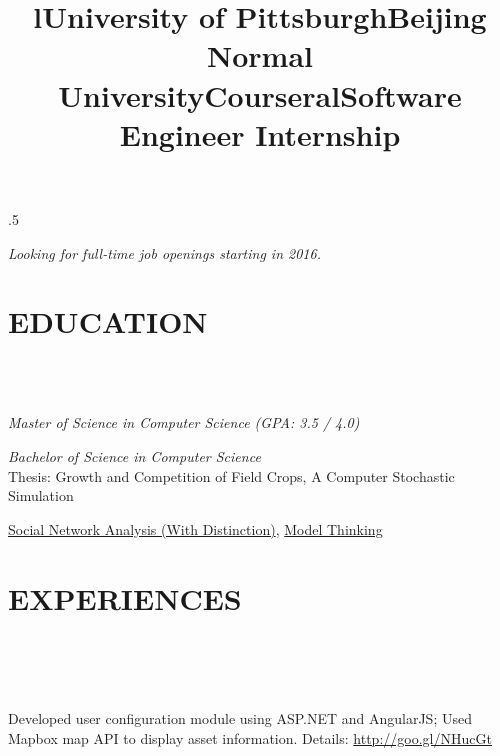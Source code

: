 \begin{resume}

\moveleft.5\hoffset\centerline{\emph{Looking for full-time job openings starting in 2016.}}

\section{\textsc{EDUCATION}}
\begin{formatb}
  \title{l}\\
   \body\\
\end{formatb}

\title{\textbf{University of Pittsburgh}}
\begin{position}
	{\sl Master of Science in Computer Science (GPA: 3.5 / 4.0)}
\end{position}

\title{\textbf{Beijing Normal University}}
\begin{position}
 	{\sl Bachelor of Science in Computer Science}\\
    Thesis: Growth and Competition of Field Crops, A Computer Stochastic Simulation
\end{position}

\title{\textbf{Coursera}}
\begin{position}
    \href{http://qiaozhang-wordpress.stor.sinaapp.com/uploads/2012/11/SNAcertificate.pdf}{Social Network Analysis (With Distinction)}, \href{http://qiaozhang-wordpress.stor.sinaapp.com/uploads/2012/09/ModelCert.pdf}{Model Thinking}
\end{position}



\section{\textsc{EXPERIENCES}}
\begin{formatb}
	\title{l}\\
	\\
	\body\\
\end{formatb}


\title{\textbf{Software Engineer Internship}}
\begin{position}
	Developed user configuration module using ASP.NET and AngularJS; Used Mapbox map API to display asset information.
	Details: \url{http://goo.gl/NHucGt}
\end{position}



\end{resume}

